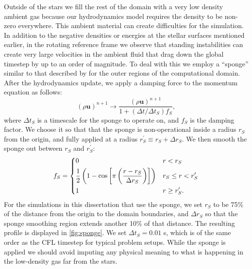 \documentclass[12pt]{article}
\begin{document}
Outside of the stars we fill the rest of the domain with a very low density 
ambient gas because our hydrodynamics model requires the density to be 
non-zero everywhere. This ambient material can create difficulties for the simulation.
In addition to the negative densities or energies at the stellar surfaces mentioned earlier, 
in the rotating reference frame we observe that standing instabilities can create very 
large velocities in the ambient fluid that drag down the global timestep by 
up to an order of magnitude.  To deal with this we employ a ``sponge'' similar 
to that described by \citet{maestro3} for the outer regions of the computational domain. 
After the hydrodynamics update, we apply a damping force to the momentum
equation as follows:
\begin{equation}
  (\rho \mathbf{u})^{n+1} \to \frac{(\rho \mathbf{u})^{n+1}}{1 + (\Delta t / \Delta t_S) f_S},
\end{equation} 
where $\Delta t_S$ is a timescale for the sponge to operate on, and
$f_S$ is the damping factor.  We choose it so that that the sponge is
non-operational inside a radius $r_S$ from the origin, and fully
applied at a radius $r_S^\prime \equiv r_S + \Delta r_S$. We then
smooth the sponge out between $r_S$ and $r_S^\prime$:
\begin{equation}
  f_{S} = \begin{dcases} 0 & r < r_S \\ \frac{1}{2}\left(1 - \text{cos}\left[\pi\left(\dfrac{r - r_S}{\Delta r_S}\right)\right]\right) & r_S \leq r < r_S^\prime \\ 1 & r \geq r_S^\prime. \end{dcases}\label{eq:sponge_frac}
\end{equation}
For the simulations in this dissertation that use the sponge, we set $r_S$ to be 75\% of the 
distance from the origin to the domain boundaries, and $\Delta r_S$ so
that the sponge smoothing region extends another 10\% of that distance.
The resulting profile is displayed in \autoref{fig:sponge}. We set $\Delta
t_S = 0.01$ s, which is of the same order as the CFL timestep
for typical problem setups. While the sponge is applied we should avoid imputing any physical 
meaning to what is happening in the low-density gas far from the stars.
\end{document}
